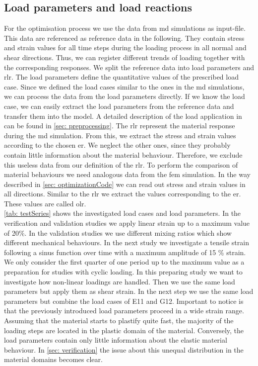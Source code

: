 \subsection{Load parameters and load reactions}\label{subsec:loadParameters}
For the optimisation process we use the data from \acrshort{md} simulations as input-file. This data are referenced as reference data in the following. They contain stress and strain values for all time steps during the loading process in all normal and shear directions. Thus, we can register different trends of loading together with the corresponding responses.
We split the reference data into load parameters and \acrlong{rlr}. The load parameters define the quantitative values of the prescribed load case. 
Since we defined the load cases similar to the ones in the \acrshort{md} simulations, we can process the data from the load parameters directly.  If we know the load case, we can easily extract the load parameters from the reference data and transfer them into the  model. A detailed description of the load application in  can be found in \autoref{sec: preprocessing}. 
The \acrshort{rlr} represent the material response during the \acrshort{md} simulation. From this, we extract the stress and strain values according to the chosen \acrlong{er}.  We neglect the other ones, since they probably contain little information about the material behaviour. Therefore, we exclude this useless data from our definition of the \acrshort{rlr}.
To perform the comparison of material behaviours we need analogous data from the \acrshort{fem} simulation. In the way described in \autoref{sec: optimizationCode} we can read out stress and strain values in all directions. Similar to the \acrlong{rlr} we extract the values corresponding to the \acrlong{er}. These values are called \acrlong{olr}. \\
\autoref{tab: testSeries} shows the investigated load cases and load parameters.
In the verification and validation studies we apply linear strain up to a maximum value of 20\%. In the validation studies we use different mixing ratios which show different mechanical behaviours. In the next study we investigate a tensile strain following a sinus function over time with a maximum amplitude of 15 \(\%\) strain. We only consider the first quarter of one period up to the maximum value as a preparation for studies with cyclic loading. In this preparing study we want to investigate how non-linear loadings are handled. Then we use the same load parameters but apply them as shear strain. In the next step we use the same load parameters but combine the load cases of E11 and G12. Important to notice is that the previously introduced load parameters proceed in a wide strain range. Assuming that the material starts to plastify quite fast, the majority of the loading steps are located in the plastic domain of the material. Conversely, the load parameters contain only little information about the elastic material behaviour. In \autoref{sec: verification} the issue about this unequal distribution in the material domains becomes clear.    
